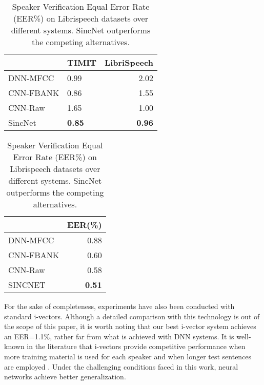 \documentclass{article}
\def \hfillx {\hspace*{-\textwidth} \hfill}
\begin{document}
    \begin{table}[t!]
        \begin{minipage}{0.55\textwidth}
            \centering
               \begin{tabular}{llr}  
                \toprule
                & TIMIT & LibriSpeech  \\ 
                \midrule
                DNN-MFCC             &   0.99      &  2.02      \\ 
                CNN-FBANK       &   0.86      &  1.55     \\ 
                CNN-Raw       &   1.65     &  1.00       \\ 
                SincNet       &   \textbf{0.85}      &  \textbf{0.96}      \\ 
                \bottomrule
            \end{tabular}
            \caption{Classification Error Rate (CER\%) of speaker identification systems trained on TIMIT (462 spks) and Librispeech (2484 spks) datasets. SincNet outperforms the
competing alternatives.}
             \label{tab:spk_id_res}

        \end{minipage}
        \hfillx
        \begin{minipage}{0.4\textwidth}
            \centering
            \begin{tabular}{lr}  
            \toprule
            & EER(\%)  \\ 
            \midrule
            DNN-MFCC   &  0.88  \\ 
            CNN-FBANK   &  0.60  \\ 
            CNN-Raw     &  0.58 \\ 
            SINCNET     &  \textbf{0.51}    \\
            \bottomrule
            \end{tabular}
            \caption{Speaker Verification Equal Error Rate (EER\%) on Librispeech datasets over different systems. SincNet outperforms the competing alternatives.}
            \label{tab:spk_ver_res}
        \end{minipage}
    \end{table} 



For the sake of completeness, experiments have also been conducted with standard i-vectors.
Although a detailed comparison with this technology is out of the scope of this paper, it is worth noting that our best i-vector system achieves an EER=1.1\%, rather far from what is achieved with DNN systems. It is well-known in the literature that i-vectors provide competitive performance when more training material is used for each speaker and when longer test sentences are employed \cite{i-vect_short,i-vect_short2,i-vect_short3}. Under the challenging conditions faced in this work, neural networks achieve better generalization. 
\end{document}
